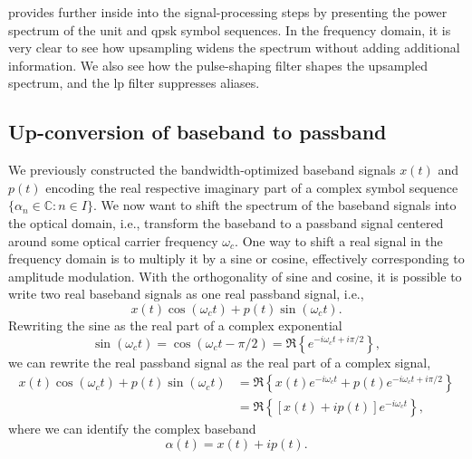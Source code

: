  provides further inside into the signal-processing steps by presenting the power spectrum of the unit and \gls{qpsk} symbol sequences.
In the frequency domain, it is very clear to see how upsampling widens the spectrum without adding additional information.
We also see how the pulse-shaping filter shapes the upsampled spectrum, and the \gls{lp} filter suppresses aliases.

\FloatBarrier
\subsection{Up-conversion of baseband to passband}

We previously constructed the bandwidth-optimized baseband signals $x(t)$ and $p(t)$ encoding the real respective imaginary part of a complex symbol sequence $\{\alpha_n\in\mathbb{C}\colon n\in I\}$.
We now want to shift the spectrum of the baseband signals into the optical domain, i.e., transform the baseband to a passband signal centered around some optical carrier frequency $\omega_c$.
One way to shift a real signal in the frequency domain is to multiply it by a sine or cosine, effectively corresponding to amplitude modulation.
With the orthogonality of sine and cosine, it is possible to write two real baseband signals as one real passband signal, i.e.,
\begin{equation}
	x(t)
	\cos(\omega_ct)
	+
	p(t)
	\sin(\omega_ct)
	.
\end{equation}
Rewriting the sine as the real part of a complex exponential
\begin{equation}
	\sin(\omega_ct)
	=
	\cos(\omega_c t-\pi/2)
	=
	\Re\left\{e^{-i\omega_c t+i\pi/2}\right\}
	,
\end{equation}
we can rewrite the real passband signal as the real part of a complex signal,
\begin{equation}
	\begin{split}
		x(t)
		\cos(\omega_ct)
		+
		p(t)
		\sin(\omega_ct)
		&=
		\Re\left\{
			x(t)
			e^{-i\omega_ct}
			+
			p(t)
			e^{-i\omega_ct+i\pi/2}
		\right\}
		\\
		&=
		\Re\left\{
			\left[
				x(t)
				+
				ip(t)
			\right]
			e^{-i\omega_ct}
		\right\}
		,
	\end{split}
	\label{eq:real_complex_passband}
\end{equation}
where we can identify the complex baseband
\begin{equation}
	\alpha(t)
	=
	x(t)
	+
	ip(t)
	.
\end{equation}

